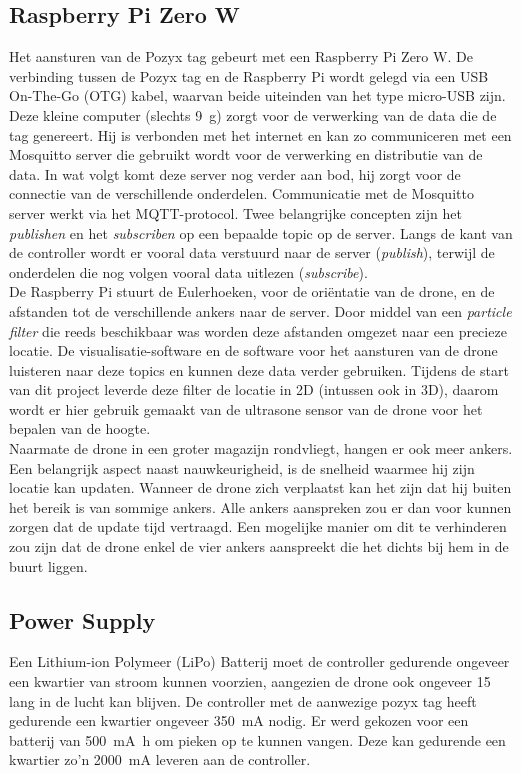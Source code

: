 \subsection{Raspberry Pi Zero W} \label{sec:zerow}
Het aansturen van de Pozyx tag gebeurt met een Raspberry Pi Zero W.
De verbinding tussen de Pozyx tag en de Raspberry Pi wordt gelegd via een USB On-The-Go (OTG) kabel, waarvan beide uiteinden van het type micro-USB zijn.
Deze kleine computer (slechts \SI{9}{\g}) zorgt voor de verwerking van de data die de tag genereert.
Hij is verbonden met het internet en kan zo communiceren met een Mosquitto server die gebruikt wordt voor de verwerking en distributie van de data.
In wat volgt komt deze server nog verder aan bod, hij zorgt voor de connectie van de verschillende onderdelen.
Communicatie met de Mosquitto server werkt via het MQTT-protocol.
Twee belangrijke concepten zijn het \textit{publishen} en het \textit{subscriben} op een bepaalde topic op de server.
Langs de kant van de controller wordt er vooral data verstuurd naar de server (\textit{publish}), terwijl de onderdelen die nog volgen vooral data uitlezen (\textit{subscribe}).\\

De Raspberry Pi stuurt de Eulerhoeken, voor de ori\"entatie van de drone, en de afstanden tot de verschillende ankers naar de server. Door middel van een \textit{particle filter} die reeds beschikbaar was worden deze afstanden omgezet naar een precieze locatie. De visualisatie-software en de software voor het aansturen van de drone luisteren naar deze topics en kunnen deze data verder gebruiken.
Tijdens de start van dit project leverde deze filter de locatie in 2D (intussen ook in 3D), daarom wordt er hier gebruik gemaakt van de ultrasone sensor van de drone voor het bepalen van de hoogte.\\

Naarmate de drone in een groter magazijn rondvliegt, hangen er ook meer ankers.
Een belangrijk aspect naast nauwkeurigheid, is de snelheid waarmee hij zijn locatie kan updaten.
Wanneer de drone zich verplaatst kan het zijn dat hij buiten het bereik is van sommige ankers.
Alle ankers aanspreken zou er dan voor kunnen zorgen dat de update tijd vertraagd.
Een mogelijke manier om dit te verhinderen zou zijn dat de drone enkel de vier ankers aanspreekt die het dichts bij hem in de buurt liggen.

\subsection{Power Supply} \label{sec:power_supply}
Een Lithium-ion Polymeer (LiPo) Batterij moet de controller gedurende ongeveer een kwartier van stroom kunnen voorzien, aangezien de drone ook ongeveer \SI{15}{\min} lang in de lucht kan blijven.
De controller met de aanwezige pozyx tag heeft gedurende een kwartier ongeveer \SI{350}{\mA} nodig.
Er werd gekozen voor een batterij van \SI{500}{\mA\hour} om pieken op te kunnen vangen.
Deze kan gedurende een kwartier zo'n \SI{2000}{\mA} leveren aan de controller.\\

